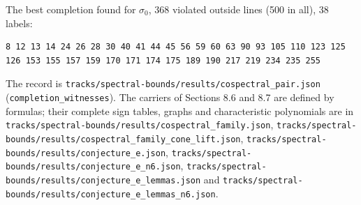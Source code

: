 \documentclass[11pt,a4paper]{article}
\begin{document}
The best completion found for \(\sigma_0\), 368 violated outside lines (500 in all), 38 labels:

\begin{verbatim}
8 12 13 14 24 26 28 30 40 41 44 45 56 59 60 63 90 93 105 110 123 125 126 153 155 157 159 170 171 174 175 189 190 217 219 234 235 255
\end{verbatim}

The record is \nolinkurl{tracks/spectral-bounds/results/cospectral_pair.json} (\nolinkurl{completion_witnesses}). The carriers of Sections 8.6 and
8.7 are defined by formulas; their complete sign tables, graphs and characteristic polynomials are in
\nolinkurl{tracks/spectral-bounds/results/cospectral_family.json}, \nolinkurl{tracks/spectral-bounds/results/cospectral_family_cone_lift.json},
\nolinkurl{tracks/spectral-bounds/results/conjecture_e.json}, \nolinkurl{tracks/spectral-bounds/results/conjecture_e_n6.json}, \nolinkurl{tracks/spectral-bounds/results/conjecture_e_lemmas.json} and
\nolinkurl{tracks/spectral-bounds/results/conjecture_e_lemmas_n6.json}.
\end{document}
